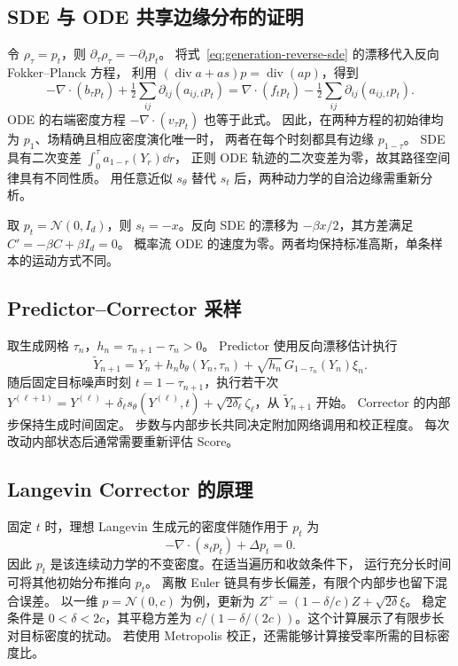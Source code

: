 \subsection{SDE 与 ODE 共享边缘分布的证明\requiredderivation}

令 \(\rho_\tau=p_t\)，则 \(\partial_\tau\rho_\tau=-\partial_t p_t\)。
将式~\eqref{eq:generation-reverse-sde} 的漂移代入反向 Fokker--Planck 方程，
利用 \((\operatorname{div}a+a s)p=\operatorname{div}(ap)\)，得到
\[
 -\nabla\cdot(b_\tau p_t)+\tfrac12\sum_{ij}\partial_{ij}(a_{ij,t}p_t)
 =\nabla\cdot(f_tp_t)-\tfrac12\sum_{ij}\partial_{ij}(a_{ij,t}p_t).
\]
ODE 的右端密度方程 \(-\nabla\cdot(v_\tau p_t)\) 也等于此式。
因此，在两种方程的初始律均为 \(p_1\)、场精确且相应密度演化唯一时，
两者在每个时刻都具有边缘 \(p_{1-\tau}\)。
SDE 具有二次变差 \(\int_0^\tau a_{1-r}(Y_r)\dd r\)，
正则 ODE 轨迹的二次变差为零，故其路径空间律具有不同性质。
用任意近似 \(s_\theta\) 替代 \(s_t\) 后，两种动力学的自洽边缘需重新分析。

\begin{example}[平稳 VP 的符号核对]
取 \(p_t=\mathcal N(0,I_d)\)，则 \(s_t=-x\)。反向 SDE 的漂移为
\(-\beta x/2\)，其方差满足 \(C'=-\beta C+\beta I_d=0\)。
概率流 ODE 的速度为零。两者均保持标准高斯，单条样本的运动方式不同。
\end{example}

\subsection{Predictor--Corrector 采样}

取生成网格 \(\tau_n\)，\(h_n=\tau_{n+1}-\tau_n>0\)。
Predictor 使用反向漂移估计执行
\[
 \widetilde Y_{n+1}=Y_n+h_n b_\theta(Y_n,\tau_n)
                +\sqrt{h_n}\,G_{1-\tau_n}(Y_n)\xi_n.
\]
随后固定目标噪声时刻 \(t=1-\tau_{n+1}\)，执行若干次
\(Y^{(\ell+1)}=Y^{(\ell)}+\delta_\ell s_\theta(Y^{(\ell)},t)
+\sqrt{2\delta_\ell}\zeta_\ell\)，从 \(\widetilde Y_{n+1}\) 开始。
Corrector 的内部步保持生成时间固定。
步数与内部步长共同决定附加网络调用和校正程度。
每次改动内部状态后通常需要重新评估 Score。

\subsection{Langevin Corrector 的原理}

固定 \(t\) 时，理想 Langevin 生成元的密度伴随作用于 \(p_t\) 为
\[
 -\nabla\cdot(s_tp_t)+\Delta p_t=0.
\]
因此 \(p_t\) 是该连续动力学的不变密度。在适当遍历和收敛条件下，
运行充分长时间可将其他初始分布推向 \(p_t\)。
离散 Euler 链具有步长偏差，有限个内部步也留下混合误差。
以一维 \(p=\mathcal N(0,c)\) 为例，更新为
\(Z^+=(1-\delta/c)Z+\sqrt{2\delta}\xi\)。
稳定条件是 \(0<\delta<2c\)，其平稳方差为
\(c/(1-\delta/(2c))\)。这个计算展示了有限步长对目标密度的扰动。
若使用 Metropolis 校正，还需能够计算接受率所需的目标密度比。

